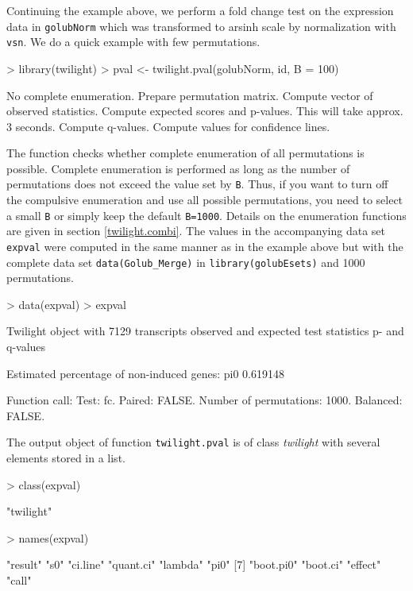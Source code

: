 \documentclass[11pt,a4paper,fleqn]{report}
\newcommand{\Robject}[1]{{\texttt{#1}}}
\newcommand{\Rfunction}[1]{{\texttt{#1}}}
\newcommand{\Rclass}[1]{{\textit{#1}}}
\newcommand{\Rfunarg}[1]{{\texttt{#1}}}
\begin{document}
Continuing the example above, we perform a fold change test on the expression data in \Robject{golubNorm} which was transformed to arsinh scale by normalization with \Rfunction{vsn}. We do a quick example with few permutations.
\begin{Schunk}
\begin{Sinput}
> library(twilight)
> pval <- twilight.pval(golubNorm, id, B = 100)
\end{Sinput}
\begin{Soutput}
No complete enumeration. Prepare permutation matrix. 
Compute vector of observed statistics. 
Compute expected scores and p-values. This will take approx. 3 seconds. 
Compute q-values. 
Compute values for confidence lines. 
\end{Soutput}
\end{Schunk}

The function checks whether complete enumeration of all permutations is possible. Complete enumeration is performed as long as the number of permutations does not exceed the value set by \Rfunarg{B}. Thus, if you want to turn off the compulsive enumeration and use all possible permutations, you need to select a small \Rfunarg{B} or simply keep the default \Rfunarg{B=1000}. Details on the enumeration functions are given in section \ref{twilight.combi}.
The values in the accompanying data set \Robject{expval} were computed in the same manner as in the example above but with the complete data set \Rfunction{data(Golub\_Merge)} in \Rfunction{library(golubEsets)} and 1000 permutations.
\begin{Schunk}
\begin{Sinput}
> data(expval)
> expval
\end{Sinput}
\begin{Soutput}
 Twilight object with
     7129 transcripts
     observed and expected test statistics
     p- and q-values

 Estimated percentage of non-induced genes:
     pi0 
0.619148 

 Function call:
 Test: fc. Paired: FALSE. Number of permutations: 1000. Balanced: FALSE. 
\end{Soutput}
\end{Schunk}

The output object of function \Rfunction{twilight.pval} is of class \Rclass{twilight} with several elements stored in a list.
\begin{Schunk}
\begin{Sinput}
> class(expval)
\end{Sinput}
\begin{Soutput}
[1] "twilight"
\end{Soutput}
\begin{Sinput}
> names(expval)
\end{Sinput}
\begin{Soutput}
 [1] "result"   "s0"       "ci.line"  "quant.ci" "lambda"   "pi0"     
 [7] "boot.pi0" "boot.ci"  "effect"   "call"    
\end{Soutput}
\end{Schunk}
\end{document}
